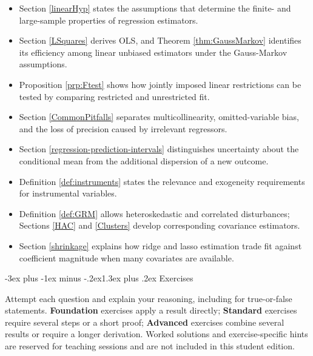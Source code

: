\documentclass[
  11pt,
]{book}
\makeatletter
\providecommand{\tightlist}{%
  \setlength{\itemsep}{0pt}\setlength{\parskip}{0pt}}
\renewcommand\section{\@startsection{section}{1}{\z@}
  {-3ex plus -1ex minus -.2ex}{1.3ex plus .2ex}
  {\normalfont\Large\bfseries\color{TextbookInk}}}
\theoremstyle{definition}
\theoremstyle{definition}
\theoremstyle{definition}
\theoremstyle{definition}
\theoremstyle{remark}
\makeatother
\begin{document}
\begin{recapbox}

\begin{itemize}
\tightlist
\item
  Section \ref{linearHyp} states the assumptions that determine the finite- and large-sample properties of regression estimators.
\item
  Section \ref{LSquares} derives OLS, and Theorem \ref{thm:GaussMarkov} identifies its efficiency among linear unbiased estimators under the Gauss-Markov assumptions.
\item
  Proposition \ref{prp:Ftest} shows how jointly imposed linear restrictions can be tested by comparing restricted and unrestricted fit.
\item
  Section \ref{CommonPitfalls} separates multicollinearity, omitted-variable bias, and the loss of precision caused by irrelevant regressors.
\item
  Section \ref{regression-prediction-intervals} distinguishes uncertainty about the conditional mean from the additional dispersion of a new outcome.
\item
  Definition \ref{def:instruments} states the relevance and exogeneity requirements for instrumental variables.
\item
  Definition \ref{def:GRM} allows heteroskedastic and correlated disturbances; Sections \ref{HAC} and \ref{Clusters} develop corresponding covariance estimators.
\item
  Section \ref{shrinkage} explains how ridge and lasso estimation trade fit against coefficient magnitude when many covariates are available.
\end{itemize}

\end{recapbox}

\clearpage

\section{Exercises}\label{regressions-exercises}

Attempt each question and explain your reasoning, including for true-or-false statements. \textbf{Foundation} exercises apply a result directly; \textbf{Standard} exercises require several steps or a short proof; \textbf{Advanced} exercises combine several results or require a longer derivation. Worked solutions and exercise-specific hints are reserved for teaching sessions and are not included in this student edition.
\end{document}
